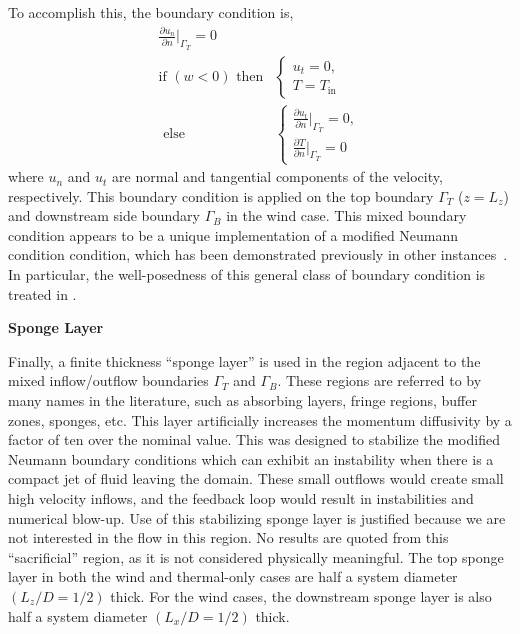 To accomplish this, the boundary condition is,
\begin{align}
  \frac{\partial u_n}{\partial n}\bigg|_{\Gamma_T} = 0 \\
  \text{if } (w<0) \text{ then}& \begin{cases}
    u_t = 0,\\
    T = T_{\text{in}}
  \end{cases} \\
  \text{ else}& \begin{cases}
    \frac{\partial u_t}{\partial n}\bigg|_{\Gamma_T} = 0, \\  
    \frac{\partial T}{\partial n}\bigg|_{\Gamma_T} = 0
  \end{cases}
\end{align}
where $u_n$ and $u_t$ are normal and tangential components of the velocity, 
respectively. This boundary condition is applied on the top boundary
$\Gamma_T$ ($z=L_z$) and downstream side boundary  $\Gamma_B$ in the
wind case. This mixed boundary condition appears to be a unique
implementation of a modified Neumann condition condition, which has been 
demonstrated previously in other
instances~\cite{braack2014directional,feistauer2006non}. In particular,
the well-posedness of this general class of boundary condition is
treated in \cite{bruneau1996new}.  

\textbf{Sponge Layer} 

Finally, a finite thickness ``sponge layer'' is used in the region adjacent 
to the mixed inflow/outflow boundaries $\Gamma_T$ and $\Gamma_B$.
These regions are referred to by many names in the
literature\cite{doi:10.1146/annurev.fluid.36.050802.121930}, such as
absorbing layers, fringe regions, buffer zones, sponges,
etc. 
This layer artificially increases the momentum diffusivity by
a factor of ten over the nominal value. This was designed to stabilize
the modified Neumann boundary conditions which can exhibit an instability
when there is a compact jet of fluid leaving the domain. 
These small outflows would create small high velocity inflows, and the
feedback loop would result in instabilities and numerical
blow-up. 
Use of this stabilizing sponge layer is justified because we are not
interested in the flow in this region. 
No results are quoted from this ``sacrificial''
region, as it is not considered physically meaningful. The top sponge
layer in both the wind and thermal-only cases are half a
system diameter $(L_z/D = 1/2)$ thick. For the wind cases, the
downstream sponge layer is also half a system diameter $(L_x/D
= 1/2)$ thick.  

